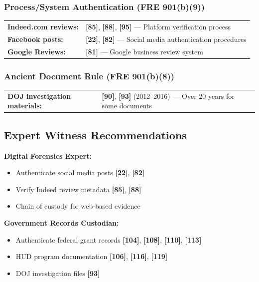 \documentclass[11pt,letterpaper]{article}
\newcommand{\citeref}[1]{\textbf{\color{NavyBlue}[#1]}}
\begin{document}
\subsubsection{Process/System Authentication (FRE 901(b)(9))}

\begin{tabular}{@{}p{2in}p{4in}@{}}
\textbf{Indeed.com reviews:} & \citeref{85}, \citeref{88}, \citeref{95} --- Platform verification process\\
\textbf{Facebook posts:} & \citeref{22}, \citeref{82} --- Social media authentication procedures\\
\textbf{Google Reviews:} & \citeref{81} --- Google business review system\\
\end{tabular}

\subsubsection{Ancient Document Rule (FRE 901(b)(8))}

\begin{tabular}{@{}p{2in}p{4in}@{}}
\textbf{DOJ investigation materials:} & \citeref{90}, \citeref{93} (2012--2016) --- Over 20 years for some documents\\
\end{tabular}

\subsection{Expert Witness Recommendations}

\textbf{Digital Forensics Expert:}
\begin{itemize}[leftmargin=*]
\item Authenticate social media posts \citeref{22}, \citeref{82}
\item Verify Indeed review metadata \citeref{85}, \citeref{88}
\item Chain of custody for web-based evidence
\end{itemize}

\textbf{Government Records Custodian:}
\begin{itemize}[leftmargin=*]
\item Authenticate federal grant records \citeref{104}, \citeref{108}, \citeref{110}, \citeref{113}
\item HUD program documentation \citeref{106}, \citeref{116}, \citeref{119}
\item DOJ investigation files \citeref{93}
\end{itemize}
\end{document}

